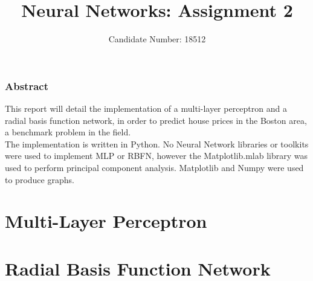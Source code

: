 \documentclass{article}
\title{Neural Networks: Assignment 2}
\author{Candidate Number: 18512}
\begin{document}
\maketitle

\begin{centering}
\subsubsection*{Abstract}
\end{centering}
\noindent This report will detail the implementation of a multi-layer perceptron and a radial basis function network, in order to predict house prices in the Boston area, a benchmark problem in the field. \\
\indent The implementation is written in Python. No Neural Network libraries or toolkits were used to implement MLP or RBFN, however the Matplotlib.mlab library was used to perform principal component analysis. Matplotlib and Numpy were used to produce graphs.

\section*{Multi-Layer Perceptron}
\section*{Radial Basis Function Network}
\end{document}
